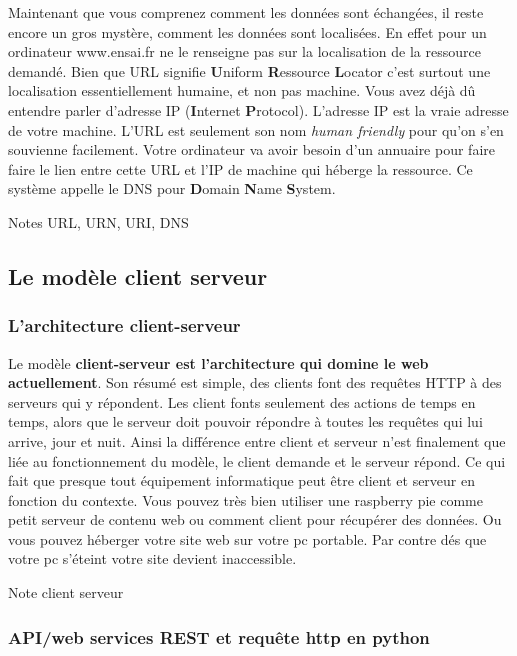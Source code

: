 \documentclass[a4paper]{article}
\begin{document}
Maintenant que vous comprenez comment les données sont échangées, il
reste encore un gros mystère, comment les données sont localisées. En
effet pour un ordinateur www.ensai.fr ne le renseigne pas sur la
localisation de la ressource demandé. Bien que URL signifie
\textbf{U}niform \textbf{R}essource \textbf{L}ocator c'est surtout une
localisation essentiellement humaine, et non pas machine. Vous avez déjà
dû entendre parler d'adresse IP (\textbf{I}nternet \textbf{P}rotocol).
L'adresse IP est la vraie adresse de votre machine. L'URL est seulement
son nom \emph{human friendly} pour qu'on s'en souvienne facilement.
Votre ordinateur va avoir besoin d'un annuaire pour faire faire le lien
entre cette URL et l'IP de machine qui héberge la ressource. Ce système
appelle le DNS pour \textbf{D}omain \textbf{N}ame \textbf{S}ystem.

            Notes URL, URN, URI, DNS

\hypertarget{header-n54}{%
\subsection{Le modèle client serveur}\label{header-n54}}

\hypertarget{header-n55}{%
\subsubsection{L'architecture client-serveur}\label{header-n55}}

Le modèle \textbf{client-serveur est l'architecture qui domine le web
actuellement}. Son résumé est simple, des clients font des requêtes HTTP
à des serveurs qui y répondent. Les client fonts seulement des actions
de temps en temps, alors que le serveur doit pouvoir répondre à toutes
les requêtes qui lui arrive, jour et nuit. Ainsi la différence entre
client et serveur n'est finalement que liée au fonctionnement du modèle,
le client demande et le serveur répond. Ce qui fait que presque tout
équipement informatique peut être client et serveur en fonction du
contexte. Vous pouvez très bien utiliser une raspberry pie comme petit
serveur de contenu web ou comment client pour récupérer des données. Ou
vous pouvez héberger votre site web sur votre pc portable. Par contre
dés que votre pc s'éteint votre site devient inaccessible.

 

            Note client serveur

\hypertarget{header-n60}{%
\subsubsection{API/web services REST et requête http en
python}\label{header-n60}}
\end{document}
